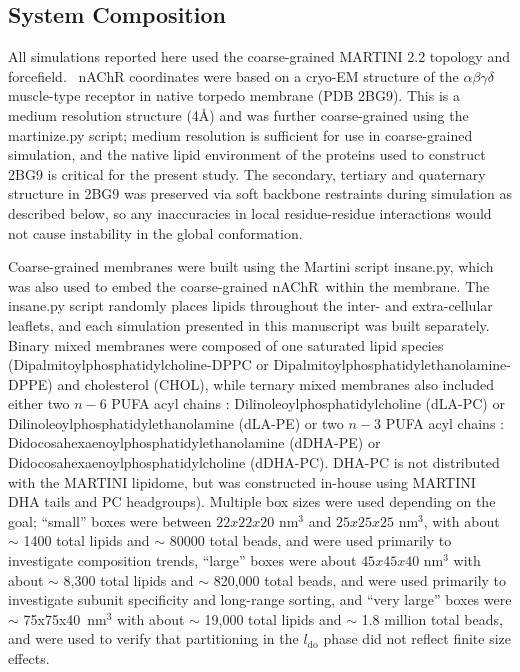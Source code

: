 \documentclass[final,3p,times,twocolumn]{elsarticle}
\newcommand{\ldo}{l_{\mathrm{do}}}
\newcommand{\nachr}{nAChR}
\begin{document}
\subsection{System Composition}

All simulations reported here used the coarse-grained MARTINI 2.2\cite{martini} topology and forcefield.
~nAChR coordinates were based on a cryo-EM structure of the $\alpha{\beta}\gamma\delta$ muscle-type receptor in native torpedo membrane (PDB 2BG9\cite{Unwin_Refined_2005}). This is a medium resolution structure (4\AA) and was further coarse-grained using the martinize.py script; medium resolution is sufficient for use in coarse-grained simulation, and the native lipid environment of the proteins used to construct 2BG9 is critical for the present study. The secondary, tertiary and quaternary structure in 2BG9 was preserved via soft backbone restraints during simulation as described below, so any inaccuracies in local residue-residue interactions would not cause instability in the global conformation.  

Coarse-grained membranes were built using the Martini script insane.py, which was also used to embed the coarse-grained \nachr~within the membrane. The insane.py script randomly places lipids throughout the inter- and extra-cellular leaflets, and each simulation presented in this manuscript was built separately.  Binary mixed membranes were composed of one saturated lipid species (Dipalmitoylphosphatidylcholine-DPPC or Dipalmitoylphosphatidylethanolamine-DPPE) and cholesterol (CHOL), while ternary mixed membranes also included either two $n-6$ PUFA acyl chains : Dilinoleoylphosphatidylcholine (dLA-PC) or Dilinoleoylphosphatidylethanolamine (dLA-PE) or two $n-3$ PUFA acyl chains : Didocosahexaenoylphosphatidylethanolamine (dDHA-PE) or Didocosahexaenoylphosphatidylcholine (dDHA-PC). DHA-PC is not distributed with the MARTINI lipidome, but was constructed in-house using MARTINI DHA tails and PC headgroups). Multiple box sizes were used depending on the goal;  ``small'' boxes were between $22x22x20$ nm$^3$ and $25x25x25$ nm$^3$, with about {$\sim$ 1400} total lipids and {$\sim$ 80000} total beads, and were used primarily to investigate composition trends, ``large'' boxes were about $45x45x40$ nm$^3$ with about {$\sim$ 8,300} total lipids and {$\sim$ 820,000} total beads, and were used primarily to investigate subunit specificity and long-range sorting, and ``very large'' boxes were $\sim$ 75x75x40~nm$^3$ with about {$\sim$ 19,000} total lipids and {$\sim$ 1.8 million} total beads, and were used to verify that partitioning in the $\ldo$ phase did not reflect finite size effects.  
\end{document}
